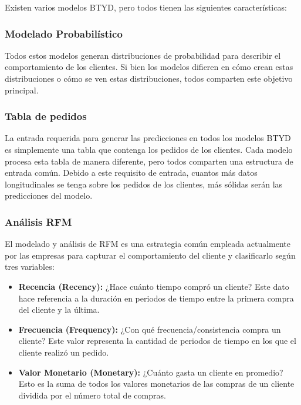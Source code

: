 Existen varios modelos BTYD, pero todos tienen las siguientes características:

\subsubsection{Modelado Probabilístico}

Todos estos modelos generan distribuciones de probabilidad para describir el comportamiento de los clientes. Si bien los modelos difieren en cómo crean estas distribuciones o cómo se ven estas distribuciones, todos comparten este objetivo principal.

\subsubsection{Tabla de pedidos}

La entrada requerida para generar las predicciones en todos los modelos BTYD es simplemente una tabla que contenga los pedidos de los clientes.  Cada modelo procesa esta tabla de manera diferente, pero todos comparten una estructura de entrada común. Debido a este requisito de entrada, cuantos más datos longitudinales se tenga sobre los pedidos de los clientes, más sólidas serán las predicciones del modelo.

\subsubsection{Análisis RFM}

 El modelado y análisis de RFM es una estrategia común empleada actualmente por las empresas para capturar el comportamiento del cliente y clasificarlo según tres variables: 
 
\begin{itemize}
	\item \textbf{Recencia (Recency):} ¿Hace cuánto tiempo compró un cliente? Este dato hace referencia a la duración en periodos de tiempo entre la primera compra del cliente y la última.	
	\item \textbf{Frecuencia (Frequency):} ¿Con qué frecuencia/consistencia compra un cliente? Este valor representa la cantidad de periodos de tiempo en los que el cliente realizó un pedido.
	\item \textbf{Valor Monetario (Monetary):} ¿Cuánto gasta un cliente en promedio? Esto es la suma de todos los valores monetarios de las compras de un cliente dividida por el número total de compras.
\end{itemize}

